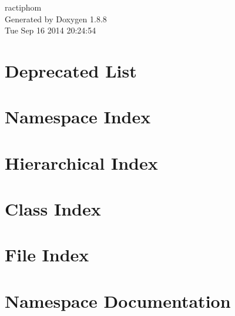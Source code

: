 \documentclass[twoside]{book}
\newcommand{\+}{\discretionary{\mbox{\scriptsize$\hookleftarrow$}}{}{}}
\newcommand{\clearemptydoublepage}{%
  \newpage{\pagestyle{empty}\cleardoublepage}%
}
\begin{document}
\hypersetup{pageanchor=false,
             bookmarks=true,
             bookmarksnumbered=true,
             pdfencoding=unicode
            }
\begin{titlepage}
\vspace*{7cm}
\begin{center}%
{\Large ractiphom }\\
\vspace*{1cm}
{\large Generated by Doxygen 1.8.8}\\
\vspace*{0.5cm}
{\small Tue Sep 16 2014 20:24:54}\\
\end{center}
\end{titlepage}
\clearemptydoublepage
\tableofcontents
\clearemptydoublepage
{}
\hypersetup{pageanchor=true}

\chapter{Deprecated List}
\label{deprecated}
\hypertarget{deprecated}{}

\chapter{Namespace Index}

\chapter{Hierarchical Index}

\chapter{Class Index}

\chapter{File Index}

\chapter{Namespace Documentation}








\end{document}
